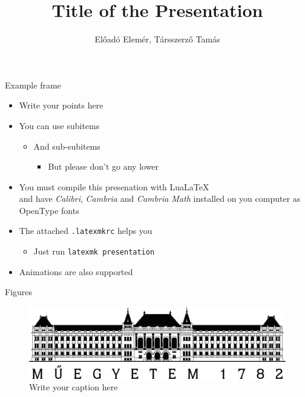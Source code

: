 \documentclass[t,14pt,aspectratio=43]{beamer}
\title{Title of the Presentation}
\author{Előadó Elemér, Társszerző Tamás}
\begin{document}
\begin{frame}
  \titlepage
\end{frame}
  
\begin{frame}{Example frame}
  \begin{itemize}
  \item Write your points here
  \item You can use subitems
    \begin{itemize}
    \item And sub-subitems
      \begin{itemize}
      \item But please don't go any lower
      \end{itemize}
    \end{itemize}
  \item You must compile this presenation with Lua\LaTeX\\
    and have \emph{Calibri}, \emph{Cambria} and \emph{Cambria Math}
    installed on you computer as OpenType fonts
  \item The attached \texttt{.latexmkrc} helps you
    \begin{itemize}
    \item Just run \texttt{latexmk presentation}
    \end{itemize}
  \item<2-> Animations are also supported
  \end{itemize}
\end{frame}

\begin{frame}[c]{Figures}
  \begin{figure}
    \centering
    \includegraphics[width=\textwidth]{figures/BMElogo.png}
    \caption{Write your caption here}
  \end{figure}
\end{frame}
\end{document}
